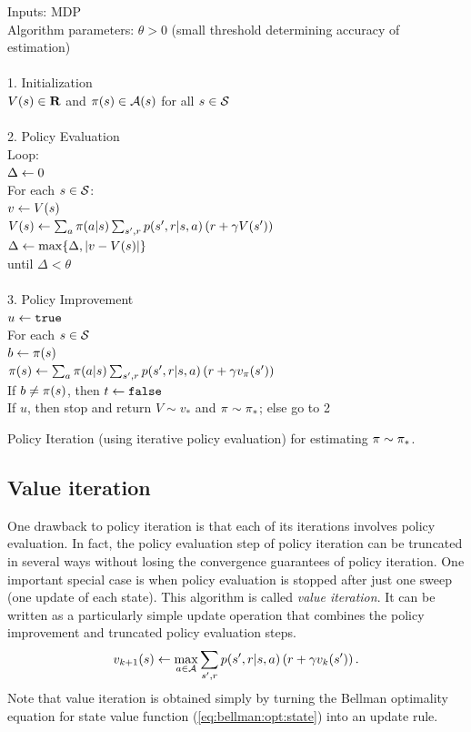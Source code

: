 \begin{table}
\beginalg
Inputs: MDP \\
Algorithm parameters: $\theta > 0$ (small threshold determining accuracy of estimation)\\
\\
1. Initialization \\
\> $V(s) \in \mathbf{R}$ and $\pi(s) \in \mathcal{A}(s)$ for all $s\in\mathcal{S}$\\
\\
2. Policy Evaluation\\
\> Loop: \\
\> \> $\Delta \leftarrow 0$ \\
\> \> For each $s\in\mathcal{S}$: \\
\> \> \> $v\leftarrow V(s)$ \\
\> \> \> $V(s) \leftarrow \sum_a \pi(a|s) \sum_{{s'}, r} p({s'}, r|s,a) \left( r + \gamma V({s'}) \right)$ \\
\> \> \> $\Delta \leftarrow \max\{\Delta, |v-V(s)|\}$ \\
\> until $\Delta < \theta$\\
\\
3. Policy Improvement\\
$u \leftarrow {\tt true}$\\
\> For each $s \in \mathcal{S}$\\
\> \> $b \leftarrow \pi(s)$\\
\> \> $\pi(s) \leftarrow \sum_a \pi(a|s) \sum_{{s'}, r} p({s'}, r|s,a) \left( r + \gamma v_{\pi}({s'}) \right)$\\
\> \> If $b \neq \pi(s)$, then $t \leftarrow {\tt false}$\\
\> If $u$, then stop and return $V \sim v_\ast$ and $\pi \sim {\ensuremath{\pi}}_\ast$; else go to 2
\endalg
\caption{Policy Iteration (using iterative policy evaluation) for estimating $\pi \sim {\ensuremath{\pi}}_\ast$.}
\label{tab:eq:policy-iteration}
\end{table}


\subsection{Value iteration}

One drawback to policy iteration is that each of its iterations involves policy evaluation.
In fact, the policy evaluation step of policy iteration can be truncated in several ways
without losing the convergence guarantees of policy iteration.
One important special case is when policy evaluation is stopped after just one sweep (one update of each state).
This algorithm is called \emph{value iteration}.
It can be written as a particularly simple update operation that combines the policy improvement and truncated policy evaluation steps.
\begin{equation}
v_{k+1}(s) \leftarrow \max_{a\in\mathcal{A}} \sum_{{s'}, r} p({s'}, r|s,a) \left( r + \gamma v_k({s'}) \right).
\end{equation}
Note that value iteration is obtained simply by turning the Bellman optimality equation for state value function
(\ref{eq:bellman:opt:state})
into an update rule.

